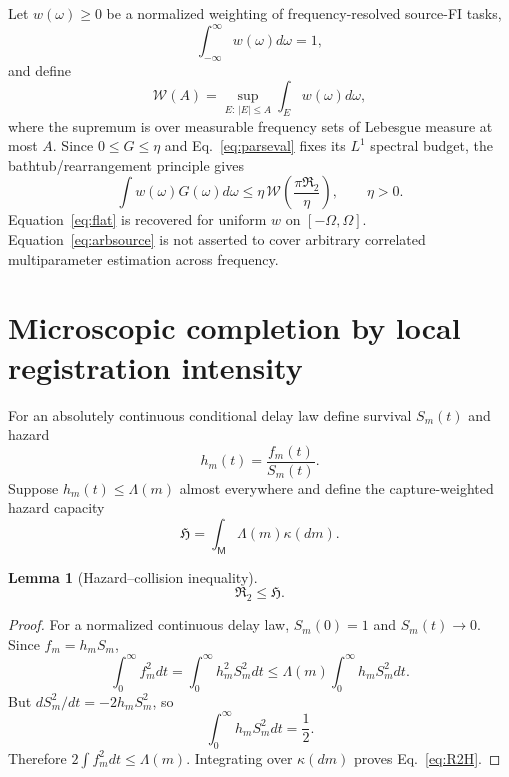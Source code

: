 \documentclass[aps,prapplied,preprint,nofootinbib]{revtex4-2}
\newtheorem{lemma}{Lemma}
\newcommand{\Wcal}{\mathcal W}
\newcommand{\Rtwo}{\mathfrak R_2}
\newcommand{\Hcap}{\mathfrak H}
\newcommand{\M}{\mathsf M}
\begin{document}
Let $w(\omega)\ge0$ be a normalized weighting of frequency-resolved source-FI tasks,
\begin{equation}
\int_{-\infty}^{\infty}w(\omega)d\omega=1,
\end{equation}
and define
\begin{equation}
\Wcal(A)=\sup_{E:\,|E|\le A}\int_Ew(\omega)d\omega,
\label{eq:W}
\end{equation}
where the supremum is over measurable frequency sets of Lebesgue measure at most $A$. Since $0\le G\le\eta$ and Eq.~\eqref{eq:parseval} fixes its $L^1$ spectral budget, the bathtub/rearrangement principle gives
\begin{equation}
\boxed{
\int w(\omega)G(\omega)d\omega
\le\eta\,\Wcal\!\left(\frac{\pi\Rtwo}{\eta}\right),\qquad \eta>0.}
\label{eq:arbsource}
\end{equation}
Equation~\eqref{eq:flat} is recovered for uniform $w$ on $[-\Omega,\Omega]$. Equation~\eqref{eq:arbsource} is not asserted to cover arbitrary correlated multiparameter estimation across frequency.

\section{Microscopic completion by local registration intensity}

For an absolutely continuous conditional delay law define survival $S_m(t)$ and hazard
\begin{equation}
h_m(t)=\frac{f_m(t)}{S_m(t)}.
\end{equation}
Suppose $h_m(t)\le\Lambda(m)$ almost everywhere and define the capture-weighted hazard capacity
\begin{equation}
\boxed{\Hcap=\int_{\M}\Lambda(m)\kappa(dm).}
\label{eq:Hcap}
\end{equation}

\begin{lemma}[Hazard--collision inequality]
\begin{equation}
\boxed{\Rtwo\le\Hcap.}
\label{eq:R2H}
\end{equation}
\end{lemma}

\begin{proof}
For a normalized continuous delay law, $S_m(0)=1$ and $S_m(t)\to0$. Since $f_m=h_mS_m$,
\begin{equation}
\int_0^\infty f_m^2dt
=\int_0^\infty h_m^2S_m^2dt
\le\Lambda(m)\int_0^\infty h_mS_m^2dt.
\end{equation}
But $dS_m^2/dt=-2h_mS_m^2$, so
\begin{equation}
\int_0^\infty h_mS_m^2dt=\frac12.
\end{equation}
Therefore $2\int f_m^2dt\le\Lambda(m)$. Integrating over $\kappa(dm)$ proves Eq.~\eqref{eq:R2H}.
\end{proof}
\end{document}
